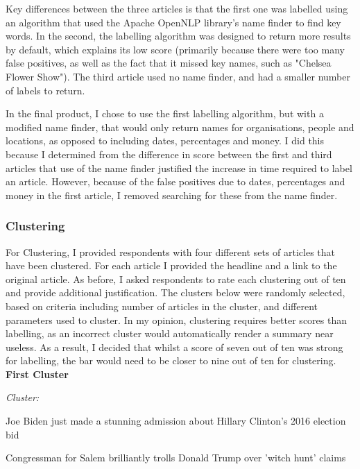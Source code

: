 \documentclass[12pt]{article}
\begin{document}
Key differences between the three articles is that the first one was labelled using an algorithm that used the Apache OpenNLP library's name finder to find key words. In the second, the labelling algorithm was designed to return more results by default, which explains its low score (primarily because there were too many false positives, as well as the fact that it missed key names, such as "Chelsea Flower Show"). The third article used no name finder, and had a smaller number of labels to return.

In the final product, I chose to use the first labelling algorithm, but with a modified name finder, that would only return names for organisations, people and locations, as opposed to including dates, percentages and money. I did this because I determined from the difference in score between the first and third articles that use of the name finder justified the increase in time required to label an article. However, because of the false positives due to dates, percentages and money in the first article, I removed searching for these from the name finder. 

\subsubsection{Clustering}

For Clustering, I provided respondents with four different sets of articles that have been clustered. For each article I provided the headline and a link to the original article. As before, I asked respondents to rate each clustering out of ten and provide additional justification. The clusters below were randomly selected, based on criteria including number of articles in the cluster, and different parameters used to cluster. In my opinion, clustering requires better scores than labelling, as an incorrect cluster would automatically render a summary near useless. As a result, I decided that whilst a score of seven out of ten was strong for labelling, the bar would need to be closer to nine out of ten for clustering.\\

\textbf{First Cluster}

\begin{mdframed}

\emph{Cluster:}

Joe Biden just made a stunning admission about Hillary Clinton's 2016 election bid

Congressman for Salem brilliantly trolls Donald Trump over 'witch hunt' claims \\

\end{mdframed}
\end{document}
